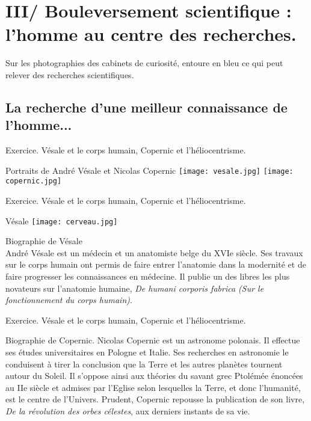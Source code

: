 \documentclass{beamer}
\begin{document}
\section{III/ Bouleversement scientifique : l'homme au centre des recherches.}

\begin{frame}
Sur les photographies des cabinets de curiosité, entoure en bleu ce qui peut relever des recherches scientifiques.
\end{frame}

\subsection{La recherche d'une meilleur connaissance de l'homme...}

\begin{frame}{Exercice. Vésale et le corps humain, Copernic et l'héliocentrisme.}
\begin{beamerboxesrounded}[scheme=blocimage]{Portraits de André Vésale et Nicolas Copernic}
\texttt{[image: vesale.jpg]}
\hfill
\texttt{[image: copernic.jpg]}
\end{beamerboxesrounded}
\end{frame}

\begin{frame}{Exercice. Vésale et le corps humain, Copernic et l'héliocentrisme.} 
\begin{beamerboxesrounded}[scheme=blocimage]{Vésale}
\texttt{[image: cerveau.jpg]}
\begin{minipage}{7cm}{Biographie de Vésale} \\
André Vésale est un médecin et un anatomiste belge du XVIe siècle. Ses travaux sur le corps humain ont permis de faire entrer l'anatomie dans la modernité et de faire progresser les connaissances en médecine. Il publie un des libres les plus novateurs sur l'anatomie humaine, \textit{De humani corporis fabrica (Sur le fonctionnement du corps humain)}. 
\end{minipage} 
\end{beamerboxesrounded}
\end{frame}

\begin{frame}{Exercice. Vésale et le corps humain, Copernic et l'héliocentrisme.} 
\begin{beamerboxesrounded}[scheme=blocimage]{Biographie de Copernic.}
Nicolas Copernic est un astronome polonais. Il effectue ses études universitaires en Pologne et Italie. Ses recherches en astronomie le conduisent à tirer la conclusion que la Terre et les autres planètes tournent autour du Soleil. Il s'oppose ainsi aux théories du savant grec Ptolémée énoncées au IIe siècle et admises par l'Eglise selon lesquelles la Terre, et donc l'humanité, est le centre de l'Univers. Prudent, Copernic repousse la publication de son livre, \textit{De la révolution des orbes célestes}, aux derniers instants de sa vie.
\end{beamerboxesrounded}
\end{frame}
\end{document}
